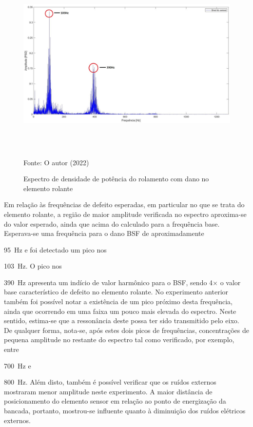 \documentclass[
	12pt,				
	oneside,			
	a4paper,			
	english,			
	brazil,			
	]{abntex2ppgsi}
\begin{document}
{{{{{{{{{{{{{{{{{{{\begin{figure}[H]
\centering
\caption {Espectro de densidade de potência do rolamento com dano no elemento rolante}
\includegraphics[width=\textwidth,height=100mm,keepaspectratio]{GraficosAnalise/PSD_DEFEITO_ELEMENTO_ROLANTE_anotado} \\
Fonte: O autor (2022)
\label{PSD_DEFEITO_ELEMENTO_ROLANTE_anotado}
\end{figure} 

Em relação às frequências de defeito esperadas, em particular no que se trata do elemento rolante, a região de maior amplitude verificada no espectro aproxima-se do valor esperado, ainda que acima do calculado para a frequência base. Esperava-se uma frequência para o dano BSF de aproximadamente {\SI{95}{\hertz} e foi detectado um pico nos {\SI{103}{\hertz}. O pico nos {\SI{390}{\hertz} apresenta um indício de valor harmônico para o BSF, sendo 4$\times$ o valor base característico de defeito no elemento rolante. No experimento anterior também foi possível notar a existência de um pico próximo desta frequência, ainda que ocorrendo em uma faixa um pouco mais elevada do espectro. Neste sentido, estima-se que a ressonância deste possa ter sido transmitido pelo eixo. De qualquer forma, nota-se, após estes dois picos de frequências, concentrações de pequena amplitude no restante do espectro tal como verificado, por exemplo, entre {\SI{700}{\hertz} e {\SI{800}{\hertz}. Além disto, também é possível verificar que os ruídos externos mostraram menor amplitude neste experimento. A maior distância de posicionamento do elemento sensor em relação ao ponto de energização da bancada, portanto, mostrou-se influente quanto à diminuição dos ruídos elétricos externos.   
 
}}}}}}}}}}}}}}}}}}}}}}}}
\end{document}
